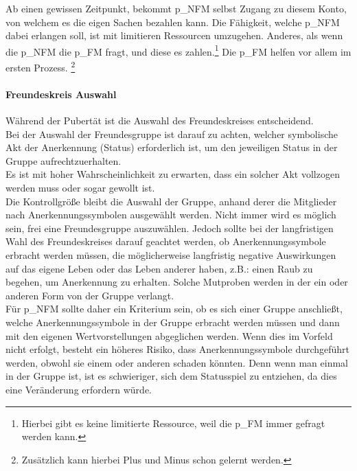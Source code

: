 Ab einen gewissen Zeitpunkt, bekommt \gls{p_NFM} selbst Zugang zu diesem Konto, von welchem es die eigen Sachen bezahlen kann. Die Fähigkeit, welche \gls{p_NFM} dabei erlangen soll, ist mit limitieren Ressourcen umzugehen. Anderes, als wenn die \gls{p_NFM} die \gls{p_FM} fragt, und diese es zahlen.\footnote{
	Hierbei gibt es keine limitierte Ressource, weil die \gls{p_FM} immer gefragt werden kann.
} Die \gls{p_FM} helfen vor allem im ersten Prozess. \footnote{
	Zusätzlich kann hierbei Plus und Minus schon gelernt werden.
}

\paragraph{Freundeskreis Auswahl}

Während der Pubertät ist die Auswahl des Freundeskreises entscheidend.\\

Bei der Auswahl der Freundesgruppe ist darauf zu achten, welcher symbolische Akt der Anerkennung (Status) erforderlich ist, um den jeweiligen Status in der Gruppe aufrechtzuerhalten.\\

Es ist mit hoher Wahrscheinlichkeit zu erwarten, dass ein solcher Akt vollzogen werden muss oder sogar gewollt ist.\\

Die Kontrollgröße bleibt die Auswahl der Gruppe, anhand derer die Mitglieder nach Anerkennungssymbolen ausgewählt werden. Nicht immer wird es möglich sein, frei eine Freundesgruppe auszuwählen. Jedoch sollte bei der langfristigen Wahl des Freundeskreises darauf geachtet werden, ob Anerkennungssymbole erbracht werden müssen, die möglicherweise langfristig negative Auswirkungen auf das eigene Leben oder das Leben anderer haben, z.B.: einen Raub zu begehen, um Anerkennung zu erhalten. Solche Mutproben werden in der ein oder anderen Form von der Gruppe verlangt.\\

Für \gls{p_NFM} sollte daher ein Kriterium sein, ob es sich einer Gruppe anschließt, welche Anerkennungssymbole in der Gruppe erbracht werden müssen und dann mit den eigenen Wertvorstellungen abgeglichen werden. Wenn dies im Vorfeld nicht erfolgt, besteht ein höheres Risiko, dass Anerkennungssymbole durchgeführt werden, obwohl sie einem oder anderen schaden könnten. Denn wenn man einmal in der Gruppe ist, ist es schwieriger, sich dem Statusspiel zu entziehen, da dies eine Veränderung erfordern würde.\\

